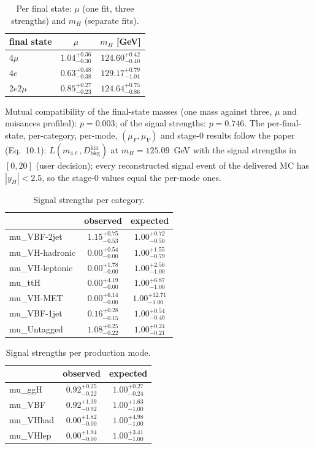 \documentclass[11pt,a4paper]{article}
\begin{document}
\begin{table}[H]\centering\small\caption{Per final state: $\mu$ (one fit, three strengths) and $m_H$ (separate fits).}\begin{tabular}{lcc}\toprule final state & $\mu$ & $m_H$ [GeV]\\\midrule
$4\mu$ & $1.04^{+0.36}_{-0.30}$ & $124.60^{+0.42}_{-0.40}$\\
$4e$ & $0.63^{+0.48}_{-0.38}$ & $129.17^{+0.79}_{-1.01}$\\
$2e2\mu$ & $0.85^{+0.27}_{-0.23}$ & $124.64^{+0.75}_{-0.86}$\\
\bottomrule\end{tabular}\end{table}
Mutual compatibility of the final-state masses (one mass against three, $\mu$ and nuisances profiled): $p=0.003$; of the signal strengths: $p=0.746$.
The per-final-state, per-category, per-mode, $(\mu_F,\mu_V)$ and stage-0 results follow the paper (Eq.~10.1): $L(m_{4\ell},D_{\text{bkg}}^{\text{kin}})$ at $m_H=125.09$~GeV with the signal strengths in $[0,20]$ (user decision); every reconstructed signal event of the delivered MC has $|y_H|<2.5$, so the stage-0 values equal the per-mode ones.
\begin{table}[H]\centering\small\caption{Signal strengths per category.}\begin{tabular}{lcc}\toprule  & observed & expected\\\midrule
mu\_VBF-2jet & $1.15^{+0.75}_{-0.53}$ & $1.00^{+0.72}_{-0.50}$\\
mu\_VH-hadronic & $0.00^{+0.54}_{-0.00}$ & $1.00^{+1.55}_{-0.79}$\\
mu\_VH-leptonic & $0.00^{+1.78}_{-0.00}$ & $1.00^{+2.56}_{-1.00}$\\
mu\_ttH & $0.00^{+4.19}_{-0.00}$ & $1.00^{+6.87}_{-1.00}$\\
mu\_VH-MET & $0.00^{+6.14}_{-0.00}$ & $1.00^{+12.71}_{-1.00}$\\
mu\_VBF-1jet & $0.16^{+0.28}_{-0.15}$ & $1.00^{+0.54}_{-0.40}$\\
mu\_Untagged & $1.08^{+0.25}_{-0.22}$ & $1.00^{+0.24}_{-0.21}$\\
\bottomrule\end{tabular}\end{table}
\begin{table}[H]\centering\small\caption{Signal strengths per production mode.}\begin{tabular}{lcc}\toprule  & observed & expected\\\midrule
mu\_ggH & $0.92^{+0.25}_{-0.22}$ & $1.00^{+0.27}_{-0.24}$\\
mu\_VBF & $0.92^{+1.39}_{-0.92}$ & $1.00^{+1.63}_{-1.00}$\\
mu\_VHhad & $0.00^{+1.82}_{-0.00}$ & $1.00^{+4.98}_{-1.00}$\\
mu\_VHlep & $0.00^{+1.94}_{-0.00}$ & $1.00^{+3.41}_{-1.00}$\\
\bottomrule\end{tabular}\end{table}
\end{document}
